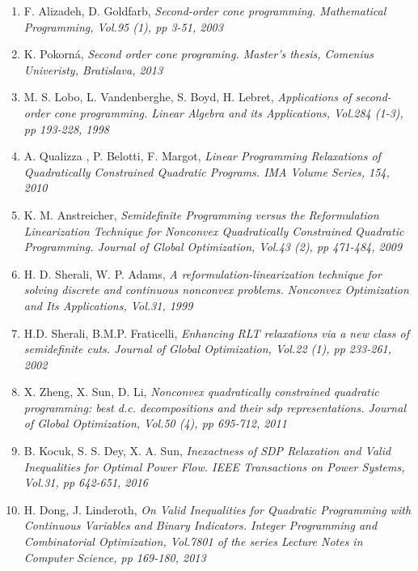 \documentclass[12pt]{book}
\theoremstyle{definition}
\begin{document}
\begin{enumerate}
%
\item F. Alizadeh, D. Goldfarb,  \it Second-order cone programming. \rm Mathematical Programming, Vol.95 (1), pp 3-51, 2003
\label{GoldfarbSOCP}
%
\item K. Pokorná, \it Second order cone programing. \rm  Master's thesis, Comenius Univeristy, Bratislava, 2013 
\label{PokornaSOCPDipl}
%
\item M. S. Lobo, L. Vandenberghe, S. Boyd, H. Lebret, \it Applications of second-order cone programming. \rm Linear Algebra and its Applications, Vol.284 (1-3), pp 193-228, 1998
\label{LoboVandApplicationsofSOCP}
%


\item A. Qualizza , P. Belotti, F. Margot, \it Linear Programming Relaxations of Quadratically Constrained Quadratic Programs. \rm 
IMA Volume Series, 154, 2010 
\label{MargotLPRelax}
%








\item K. M. Anstreicher, \it Semidefinite Programming versus the Reformulation Linearization Technique for Nonconvex Quadratically Constrained Quadratic Programming. \rm Journal of Global Optimization, Vol.43 (2), pp 471-484, 2009
\label{AnstreicherSDPvsRLT}
%
\item H. D. Sherali, W. P. Adams, \it A reformulation-linearization technique for solving discrete and continuous nonconvex problems. \rm
 Nonconvex Optimization and Its Applications, Vol.31, 1999
 \label{SheraliAdamsRLT1}
%
\item H.D. Sherali, B.M.P. Fraticelli, \it Enhancing RLT relaxations via a new class of semidefinite
cuts. \rm Journal of Global Optimization, Vol.22 (1), pp 233-261, 2002
\label{SheraliEnhancingRLT}
%
\item X. Zheng, X. Sun, D. Li, \it Nonconvex quadratically constrained quadratic programming: best d.c. decompositions and their sdp representations. \rm Journal of Global Optimization, Vol.50 (4), pp 695-712, 2011
\label{ZhengDCdecomp}
%
\item B. Kocuk, S. S. Dey, X. A. Sun, \it Inexactness of SDP Relaxation and Valid Inequalities for Optimal Power Flow. \rm
IEEE Transactions on Power Systems, Vol.31, pp 642-651, 2016
\label{InexactSDPandValidIneq}
%
\item H. Dong, J. Linderoth, \it On Valid Inequalities for Quadratic Programming with Continuous Variables and Binary Indicators. \rm  
Integer Programming and Combinatorial Optimization, Vol.7801 of the series Lecture Notes in Computer Science, pp 169-180, 2013
\label{onValidIneqforQP}






\end{enumerate}
\end{document}
